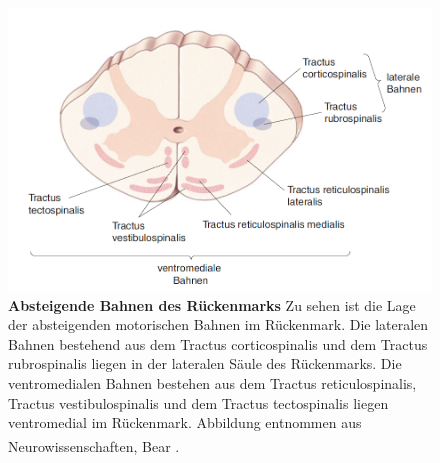 \documentclass[12pt,a4paper,pdftex]{article}
\begin{document}
\begin{figure}[H]
    \centering
    \includegraphics[width=1\textwidth]{pictures/Bilder_Laura/absteigende_bahnen_rkm.png}
    \caption[Absteigende Bahnen des Rückenmarks]{\textbf{Absteigende Bahnen des Rückenmarks} Zu sehen ist die Lage der absteigenden motorischen Bahnen im Rückenmark. Die lateralen Bahnen bestehend aus dem Tractus corticospinalis und dem Tractus rubrospinalis liegen in der lateralen Säule des Rückenmarks. Die ventromedialen Bahnen bestehen aus dem Tractus reticulospinalis, Tractus vestibulospinalis und dem Tractus tectospinalis  liegen ventromedial im Rückenmark. Abbildung entnommen aus Neurowissenschaften, Bear \textsuperscript{\cite[14]{neurowissenschaften_baer}}.}
    \label{fig:abst_Rueckenmark}
\end{figure}
\end{document}

